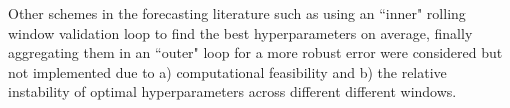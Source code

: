 \documentclass{article}
\begin{document}

Other schemes in the forecasting literature such as using an ``inner" rolling window validation loop to find the best hyperparameters on average, finally aggregating them in an ``outer" loop for a more robust error were considered but not implemented due to a) computational feasibility and b) the relative instability of optimal hyperparameters across different different windows.
\end{document}
